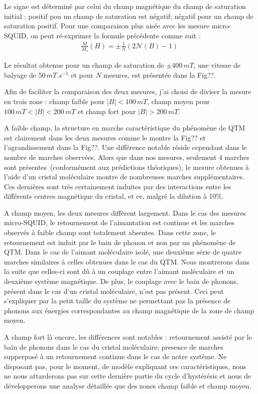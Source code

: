 Le signe est déterminé par celui du champ magnétique du champ de saturation initial : positif pou un champ de saturation est négatif; négatif pour un champ de saturation positif. Pour une comparaison plus aisée avec les mesure micro-SQUID, on peut ré-exprimer la formule précédente comme suit :
\begin{eqnarray}
\frac{M}{M_s}(H) =\pm \frac{1}{N} (2\mathscr{N}(B) -1)
\end{eqnarray}

Le résultat obtenue pour un champ de saturation de $\pm 400 \, mT$, une vitesse de balyage de $50\,mT.s^{-1}$ et pour $N$ mesures, est présentée dans la Fig??.

Afin de faciliter la comparaison des deux mesures, j'ai choisi de diviser la mesure en trois zone : champ faible pour $|B|< 100\,mT$, champ moyen pour $100\,mT<|B|< 200\,mT$ et champ fort pour $|B| > 200\,mT$.

A faible champ, la structure en marche caractéristique du phénomène de QTM est clairement  dans les deux mesures comme le montre la Fig?? et l'agrandissement dans la Fig??. Une différence notable réside cependant dans le nombre de marches observées. Alors que dans nos mesures, seulement 4 marches sont présentes~(conformément aux prédictions théoriques), le mesure obtenues à l'aide d'un cristal moléculaire montre de nombreuses marches supplémentaires. Ces dernières sont très certainement induites par des interactions entre les différents centres magnétique du cristal, et ce, malgré la dilution à 10\%.

A champ moyen, les deux mesures diffèrent largement. Dans le cas des mesures micro-SQUID, le retournement de l'aimantation est continue et les marches observés à faible champ sont totalement absentes. Dans cette zone, le retournement est induit par le bain de phonon et non par un phénomène de QTM. Dans le cas de l'aimant moléculaire isolé, une deuxième série de quatre marches similaires à celles obtenues dans le cas du QTM. Nous montrerons dans la suite que celles-ci sont d\^u à un couplage entre l'aimant moléculaire et un deuxième système magnétique. De plus, le couplage avec le bain de phonons, présent dans le cas d'un cristal moléculaire, n'est pas présent. Ceci peut s'expliquer par la petit taille du système ne permettant pas la présence de phonons aux énergies correspondantes au champ magnétique de la zone de champ moyen.

A champ fort là encore, les différences sont notables : retournement assisté par le bain de phonons dans le cas du cristal moléculaire; presence  de marches supperposé à un retournement continue dans le cas de notre système. Ne disposant pas, pour le moment, de modèle expliquant ces caractéristiques, nous ne nous attarderons pas sur cette dernière partie du cycle d’hystérésis et nous de développerons une analyse détaillée que des zones champ faible et champ moyen.

